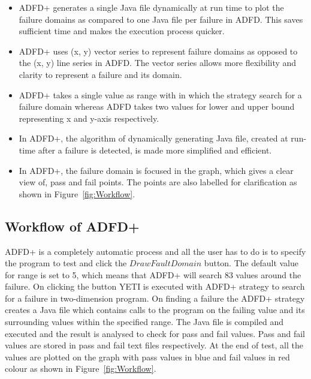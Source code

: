 \begin{itemize}
\item ADFD+ generates a single Java file dynamically at run time to plot the failure domains as compared to one Java file per failure in ADFD. This saves sufficient time and makes the execution process quicker.

\item ADFD+ uses (x, y) vector series to represent failure domains as opposed to the (x, y) line series in ADFD. The vector series allows more flexibility and clarity to represent a failure and its domain.   

\item ADFD+ takes a single value as range with in which the strategy search for a failure domain whereas ADFD takes two values for lower and upper bound representing x and y-axis respectively.

\item In ADFD+, the algorithm of dynamically generating Java file, created at run-time after a failure is detected, is made more simplified and efficient.

\item In ADFD+, the failure domain is focused in the graph, which gives a clear view of, pass and fail points. The points are also labelled for clarification as shown in Figure~\ref{fig:Workflow}. 

\end{itemize}



\subsection{Workflow of ADFD+}\label{sec:intro6_3}
ADFD+ is a completely automatic process and all the user has to do is to specify the program to test and click the $Draw Fault Domain$ button. The default value for range is set to 5, which means that ADFD+ will search 83 values around the failure. On clicking the button YETI is executed with ADFD+ strategy to search for a failure in two-dimension program. On finding a failure the ADFD+ strategy creates a Java file which contains calls to the program on the failing value and its surrounding values within the specified range. The Java file is compiled and executed and the result is analysed to check for pass and fail values. Pass and fail values are stored in pass and fail text files respectively. At the end of test, all the values are plotted on the graph with pass values in blue and fail values in red colour as shown in Figure~\ref{fig:Workflow}.
\\

